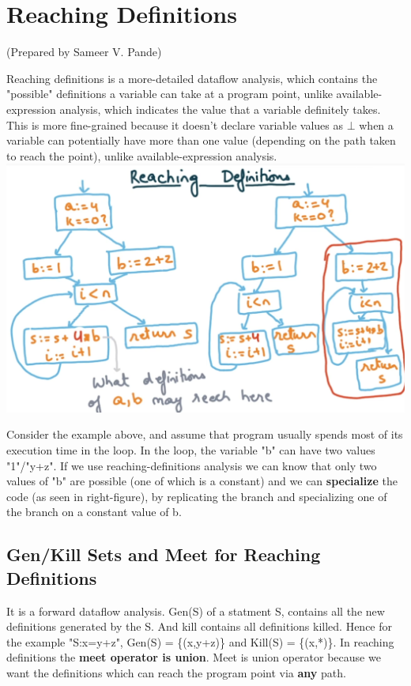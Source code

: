 \section {Reaching Definitions}
\setlength{\parindent}{0pt}
(Prepared by Sameer V. Pande)

\vspace{0.3cm}

Reaching definitions is a more-detailed dataflow analysis, which contains the "possible" definitions a variable can take at a program point, unlike available-expression analysis, which indicates the value that a variable definitely takes.
This is more fine-grained because it doesn't declare variable values as $\bot$ when a variable can potentially have more than one value (depending on the path taken to reach the point), unlike available-expression analysis.
\newline 
\includegraphics[scale=0.3]{images/90_1.png}

Consider the example above, and assume that program usually spends most of its execution time in the loop. In the loop, the variable "b" can have two values "1"/"y+z". If we use reaching-definitions analysis we can know that only two values of "b" are possible (one of which is a constant) and we can \textbf{specialize} the code (as seen in right-figure), by replicating the branch and specializing one of the branch on a constant value of b.

\subsection{Gen/Kill Sets and Meet for Reaching Definitions}
It is a forward dataflow analysis. Gen(S) of a statment S, contains all the new definitions generated by the S. And kill contains all definitions killed.
Hence for the example "S:x=y+z", Gen(S) = \{(x,y+z)\} and Kill(S) = \{(x,*)\}.
\newline
In reaching definitions the \textbf{meet operator is union}. Meet is union operator because we want the definitions which can reach the program point via \textbf{any} path. 

